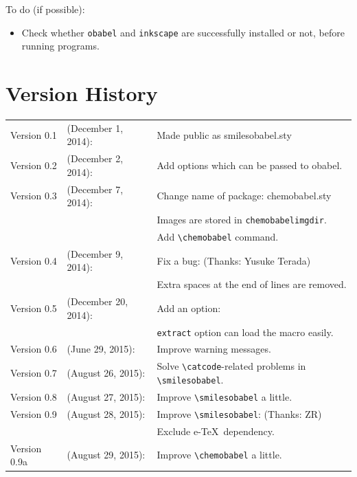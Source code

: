 \documentclass[12pt]{jsarticle}
\begin{document}
\clearpage

To do (if possible):
\begin{itemize}
\item Check whether \texttt{obabel} and \texttt{inkscape} are successfully installed or not, before running programs.
\end{itemize}

\section{Version History}

\begin{table}[h]
\centering
\begin{tabular}{lll}
Version 0.1 & (December  1, 2014): & Made public as \textsf{smilesobabel.sty} \\
Version 0.2 & (December  2, 2014): & Add options which can be passed to obabel. \\
Version 0.3 & (December  7, 2014): & Change name of package: \textsf{chemobabel.sty} \\
            &                      & Images are stored in \texttt{chemobabelimgdir}. \\
            &                      & Add \verb|\chemobabel| command. \\
Version 0.4 & (December  9, 2014): & Fix a bug: (Thanks: Yusuke Terada) \\
            &                      & Extra spaces at the end of lines are removed. \\
Version 0.5 & (December 20, 2014): & Add an option: \\
            &                      & \verb|extract| option can load the macro easily. \\
Version 0.6 & (June     29, 2015): & Improve warning messages. \\
Version 0.7 & (August   26, 2015): & Solve \verb|\catcode|-related problems in \verb|\smilesobabel|. \\
Version 0.8 & (August   27, 2015): & Improve \verb|\smilesobabel| a little. \\
Version 0.9 & (August   28, 2015): & Improve \verb|\smilesobabel|: (Thanks: ZR) \\
            &                      & Exclude e-\TeX\ dependency. \\
Version 0.9a & (August   29, 2015): & Improve \verb|\chemobabel| a little.
\end{tabular}
\end{table}
\end{document}
